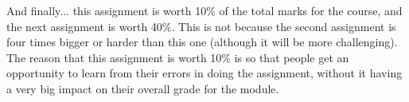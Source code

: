 \documentclass[11pt,]{article}
\begin{document}
\bigskip
And finally...  this assignment is worth 10\% of the total marks for the course, and the next assignment is worth 40\%.  This is not because the second assignment is four times bigger or harder than this one (although it will be more challenging).  The reason that this assignment is worth 10\% is so that people get an opportunity to learn from their errors in doing the assignment, without it having a very big impact on their overall grade for the module. 





\end{document}
